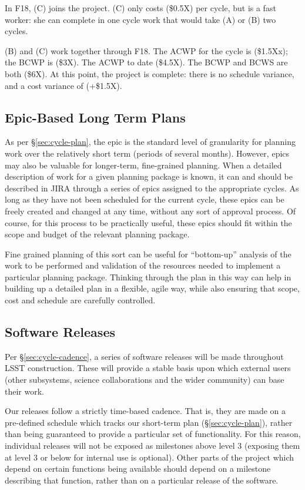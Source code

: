 In F18, (C) joins the project. (C) only costs (\$0.5X) per cycle,
but is a fast worker: she can complete in one cycle work that would take
(A) or (B) two cycles.

(B) and (C) work together through F18. The ACWP for the cycle is
(\$1.5Xx); the BCWP is (\$3X). The ACWP to date (\$4.5X). The BCWP and
BCWS are both (\$6X). At this point, the project is complete: there is
no schedule variance, and a cost variance of (+\$1.5X).

\subsection{Epic-Based Long Term
Plans}\label{epic-based-long-term-plans}

As per \S\ref{sec:cycle-plan}, the epic is the standard level of granularity for
planning work over the relatively short term (periods of several
months). However, epics may also be valuable for longer-term,
fine-grained planning. When a detailed description of work for a given
planning package is known, it can and should be described in JIRA
through a series of epics assigned to the appropriate cycles. As long as
they have not been scheduled for the current cycle, these epics can be
freely created and changed at any time, without any sort of approval
process. Of course, for this process to be practically useful, these
epics should fit within the scope and budget of the relevant planning
package.

Fine grained planning of this sort can be useful for ``bottom-up''
analysis of the work to be performed and validation of the resources
needed to implement a particular planning package. Thinking through the
plan in this way can help in building up a detailed plan in a flexible,
agile way, while also ensuring that scope, cost and schedule are
carefully controlled.

\subsection{Software Releases}\label{software-releases}

Per \S\ref{sec:cycle-cadence}, a series of software releases will be made
throughout LSST construction. These will provide a stable basis upon
which external users (other subsystems, science collaborations and the
wider community) can base their work.

Our releases follow a strictly time-based cadence. That is, they are
made on a pre-defined schedule which tracks our
short-term plan (\S\ref{sec:cycle-plan}), rather than
being guaranteed to provide a particular set of functionality. For this
reason, individual releases will not be exposed as milestones above
level 3 (exposing them at level 3 or below for internal use is
optional). Other parts of the project which depend on certain functions
being available should depend on a milestone describing that function,
rather than on a particular release of the software.

